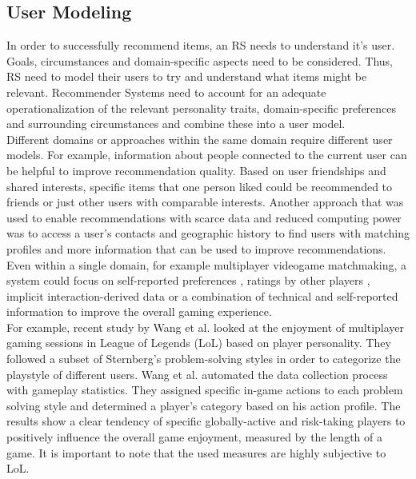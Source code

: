 \documentclass[conference]{IEEEtran}
\begin{document}
\subsection{User Modeling} \label{rw:usermodeling}
In order to successfully recommend items, an RS needs to understand it's user. Goals, circumstances and domain-specific aspects need to be considered. Thus, RS need to model their users to try and understand what items might be relevant. Recommender Systems need to account for an adequate operationalization of the relevant personality traits, domain-specific preferences and surrounding circumstances and combine these into a user model.\\
Different domains or approaches within the same domain require different user models. For example, information about people connected to the current user can be helpful to improve recommendation quality. Based on user friendships and shared interests, specific items that one person liked could be recommended to friends \cite{feng2013recommendation} or just other users with comparable interests. \cite{hsu2018general} Another approach that was used to enable recommendations with scarce data and reduced computing power was to access a user's contacts and geographic history to find users with matching profiles and more information that can be used to improve recommendations. \cite{ramaswamy2009caesar}\\ 
Even within a single domain, for example multiplayer videogame matchmaking, a system could focus on self-reported preferences \cite{riegelsberger2007personality}, ratings by other players \cite{patrick2011system}, implicit interaction-derived data \cite{suznjevic2015application, delalleau2012beyond} or a combination of technical and self-reported information to improve the overall gaming experience. \cite{farnham2009method}\\
For example, recent study by Wang et al. \cite{wang2015thinking} looked at the enjoyment of multiplayer gaming sessions in League of Legends (LoL) based on player personality. They followed a subset of Sternberg's \cite{sternberg1999thinking} problem-solving styles in order to categorize the playstyle of different users. Wang et al. automated the data collection process with gameplay statistics. They assigned specific in-game actions to each problem solving style and determined a player's category based on his action profile. The results show a clear tendency of specific globally-active and risk-taking players to positively influence the overall game enjoyment, measured by the length of a game. It is important to note that the used measures are highly subjective to LoL.\\
\end{document}
